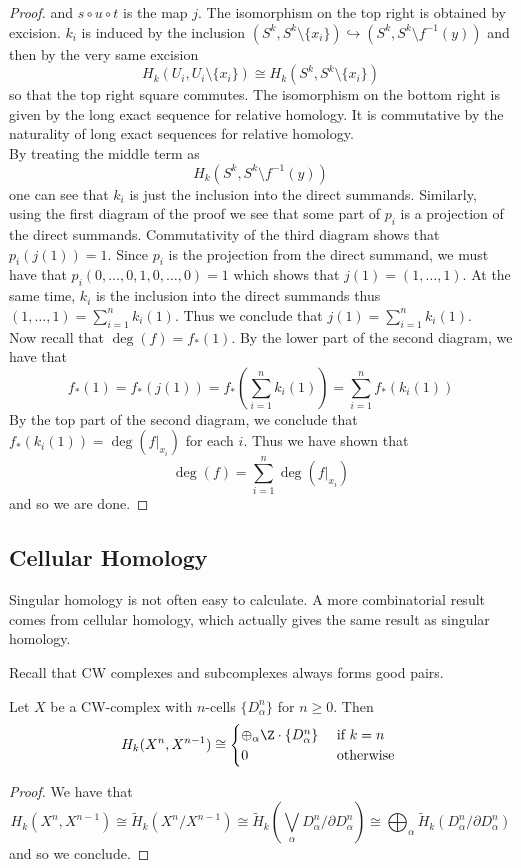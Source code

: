 \documentclass[a4paper]{article}
\begin{document}
\begin{prp}{}{}
\begin{proof}
and $s\circ u\circ t$ is the map $j$. The isomorphism on the top right is obtained by excision. $k_i$ is induced by the inclusion $(S^k,S^k\setminus\{x_i\})\hookrightarrow(S^k,S^k\setminus f^{-1}(y))$ and then by the very same excision $$H_k(U_i,U_i\setminus\{x_i\})\cong H_k(S^k,S^k\setminus\{x_i\})$$ so that the top right square commutes. The isomorphism on the bottom right is given by the long exact sequence for relative homology. It is commutative by the naturality of long exact sequences for relative homology. \\

By treating the middle term as $$H_k(S^k,S^k\setminus f^{-1}(y))$$ one can see that $k_i$ is just the inclusion into the direct summands. Similarly, using the first diagram of the proof we see that some part of $p_i$ is a projection of the direct summands. Commutativity of the third diagram shows that $p_i(j(1))=1$. Since $p_i$ is the projection from the direct summand, we must have that $p_i(0,\dots,0,1,0,\dots,0)=1$ which shows that $j(1)=(1,\dots,1)$. At the same time, $k_i$ is the inclusion into the direct summands thus $(1,\dots,1)=\sum_{i=1}^nk_i(1)$. Thus we conclude that $j(1)=\sum_{i=1}^nk_i(1)$. \\

Now recall that $\deg(f)=f_\ast(1)$. By the lower part of the second diagram, we have that $$f_\ast(1)=f_\ast(j(1))=f_\ast\left(\sum_{i=1}^nk_i(1)\right)=\sum_{i=1}^nf_\ast(k_i(1))$$ By the top part of the second diagram, we conclude that $f_\ast(k_i(1))=\deg(f|_{x_i})$ for each $i$. Thus we have shown that $$\deg(f)=\sum_{i=1}^n\deg(f|_{x_i})$$ and so we are done. 
\end{proof}
\end{prp}

\subsection{Cellular Homology}
Singular homology is not often easy to calculate. A more combinatorial result comes from cellular homology, which actually gives the same result as singular homology. 

Recall that CW complexes and subcomplexes always forms good pairs. 

\begin{lmm}{}{} Let $X$ be a CW-complex with $n$-cells $\{D_\alpha^n\}$ for $n\geq 0$. Then $$H_k(X^n,X^{n-1})\cong\begin{cases}
\oplus_\alpha\Z\cdot\{D_\alpha^n\} & \text{ if } k=n\\
0 & \text{ otherwise }
\end{cases}$$ 
\begin{proof}
We have that $$H_k(X^n,X^{n-1})\cong\widetilde{H}_k(X^n/X^{n-1})\cong\widetilde{H}_k\left(\bigvee_\alpha D_\alpha^n/\partial D_\alpha^n\right)\cong\bigoplus_\alpha\widetilde{H}_k(D_\alpha^n/\partial D_\alpha^n)$$ and so we conclude. 
\end{proof}
\end{lmm}
\end{document}
